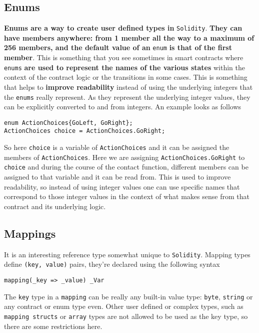 \subsection{Enums}\label{enums}

\textbf{Enums are a way to create user defined types in}
\texttt{Solidity}. \textbf{They can have members anywhere: from 1 member
all the way to a maximum of 256 members, and the default value of an}
\texttt{enum} \textbf{is that of the first member}. This is something
that you see sometimes in smart contracts where \texttt{enums}
\textbf{are used to represent the names of the various states} within
the context of the contract logic or the transitions in some cases. This
is something that helps to \textbf{improve readability} instead of using
the underlying integers that the \texttt{enums} really represent. As
they represent the underlying integer values, they can be explicitly
converted to and from integers. An example looks as follows

\begin{lstlisting}[language=Solidity,numbers=none]
enum ActionChoices{GoLeft, GoRight};
ActionChoices choice = ActionChoices.GoRight;
\end{lstlisting}

So here \texttt{choice} is a variable of \texttt{ActionChoices} and it
can be assigned the members of \texttt{ActionChoices}. Here we are
assigning \texttt{ActionChoices.GoRight} to \texttt{choice} and during
the course of the contact function, different members can be assigned to
that variable and it can be read from. This is used to improve
readability, so instead of using integer values one can use specific
names that correspond to those integer values in the context of what
makes sense from that contract and its underlying logic.

\subsection{Mappings}\label{mappings}

It is an interesting reference type somewhat unique to
\texttt{Solidity}. Mapping types define \texttt{(key,\ value)} pairs,
they're declared using the following syntax

\begin{lstlisting}[language=Solidity,numbers=none]
mapping(_key => _value) _Var
\end{lstlisting}

The \texttt{key} type in a \texttt{mapping} can be really any built-in
value type: \texttt{byte}, \texttt{string} or any contract or enum type
even. Other user defined or complex types, such as
\texttt{mapping\ structs} or \texttt{array} types are not allowed to be
used as the key type, so there are some restrictions here.

